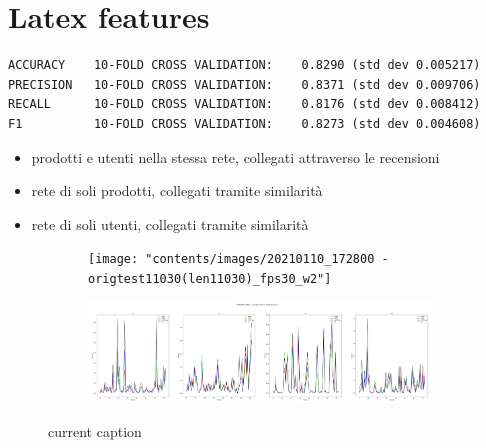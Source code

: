 

\chapter{Latex features}
\label{chap:test}


\begin{verbatim}
ACCURACY    10-FOLD CROSS VALIDATION:    0.8290 (std dev 0.005217)
PRECISION   10-FOLD CROSS VALIDATION:    0.8371 (std dev 0.009706)
RECALL      10-FOLD CROSS VALIDATION:    0.8176 (std dev 0.008412)
F1          10-FOLD CROSS VALIDATION:    0.8273 (std dev 0.004608)
\end{verbatim}

\begin{itemize}
	\item prodotti e utenti nella stessa rete, collegati attraverso le recensioni
	\item rete di soli prodotti, collegati tramite similarità
	\item rete di soli utenti, collegati tramite similarità
\end{itemize}

\begin{figure}[!htb]
	\begin{center}
		\begin{subfigure}[h]{0.30\textwidth}
			\centering
			\texttt{[image: "contents/images/20210110\_172800 - origtest11030(len11030)\_fps30\_w2"]}
		\end{subfigure}
		\hfill
		\begin{subfigure}[h]{0.68\textwidth}
			\centering
			\includegraphics[width=\textwidth]{"contents/images/20210110_172810 - origtest11030(len11030)_fps30_w5"}
		\end{subfigure}
	\end{center}
	\vspace{-0.5cm}
	\caption[list of figures caption]{current caption}
	\label{fig:task1}
\end{figure}

